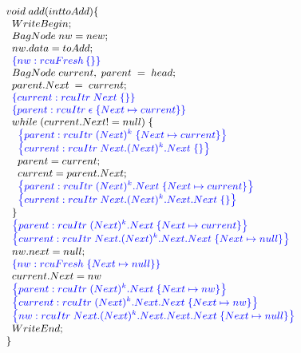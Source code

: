 \[\small
\begin{array}{@{}l@{}}
  void \; add(int toAdd)\{\\
    \;\;WriteBegin;\\
    \;\;BagNode \;nw = new;\\
    \;\; nw.data  =  toAdd;\\
    \;\;\specline{nw:rcuFresh \, \{ \} }\\
    \;\;BagNode\; current,\;parent\;=\;head;\\
    \;\;parent.Next\;=\;current;\\
    \;\;\specline{current:rcuItr\; Next \; \{\}}\\
    \;\;\specline{parent:rcuItr\; \epsilon\; \{Next \mapsto current\}}\\
    \;\;while\;(current.Next != null )\;\{\\
    \;\;\;\;\specline{parent:rcuItr\; (Next)^{k} \;\{Next \mapsto current \}}\\
    \;\;\;\;\specline{current:rcuItr\; Next.(Next)^{k}.Next\; \{ \}}\\
    \;\;\;\;parent = current;\\
    \;\;\;\;current = parent.Next;\\
    \;\;\;\;\specline{parent:rcuItr\; (Next)^{k}.Next \;\{Next \mapsto current \}}\\
    \;\;\;\;\specline{current:rcuItr\; Next.(Next)^{k}.Next.Next\; \{ \}}\\
    \;\;\}\\
    \;\;\specline{parent:rcuItr\; (Next)^{k}.Next \;\{Next \mapsto current \}}\\
    \;\;\specline{current:rcuItr\; Next.(Next)^{k}.Next.Next\; \{ Next \mapsto null \}}\\
    \;\;nw.next= null;\\
    \;\;\specline{nw:rcuFresh\; \{Next \mapsto null\}}\\
    \;\;current.Next=nw\\
    \;\;\specline{parent:rcuItr\; (Next)^{k}.Next \;\{Next \mapsto nw \}}\\
    \;\;\specline{current:rcuItr\; (Next)^{k}.Next.Next \;\{Next \mapsto nw \}}\\
    \;\;\specline{nw:rcuItr\; Next.(Next)^{k}.Next.Next.Next\; \{Next \mapsto null \}}\\
    \;\;WriteEnd;\\
  \}\\  
\end{array}
\]
